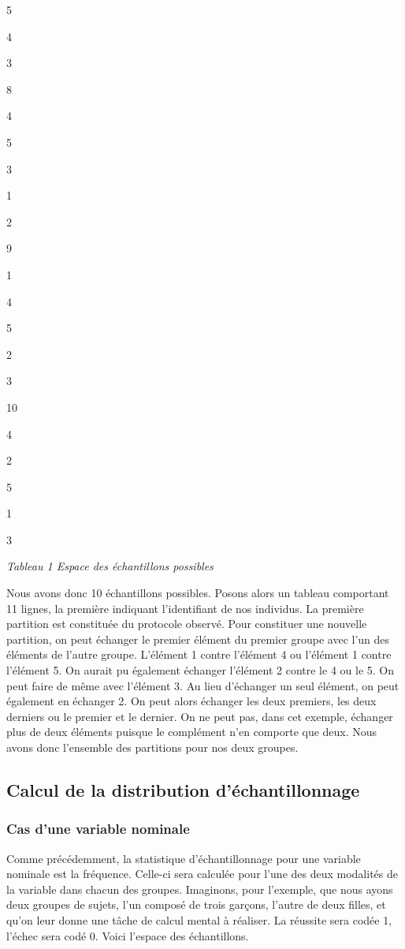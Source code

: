 \documentclass[]{book}
\theoremstyle{definition}
\theoremstyle{definition}
\theoremstyle{definition}
\theoremstyle{remark}
\begin{document}
5

4

3

8

4

5

3

1

2

9

1

4

5

2

3

10

4

2

5

1

3

\emph{Tableau 1 Espace des échantillons possibles}

Nous avons donc 10 échantillons possibles. Posons alors un tableau
comportant 11 lignes, la première indiquant l'identifiant de nos
individus. La première partition est constituée du protocole observé.
Pour constituer une nouvelle partition, on peut échanger le premier
élément du premier groupe avec l'un des éléments de l'autre groupe.
L'élément 1 contre l'élément 4 ou l'élément 1 contre l'élément 5. On
aurait pu également échanger l'élément 2 contre le 4 ou le 5. On peut
faire de même avec l'élément 3. Au lieu d'échanger un seul élément, on
peut également en échanger 2. On peut alors échanger les deux premiers,
les deux derniers ou le premier et le dernier. On ne peut pas, dans cet
exemple, échanger plus de deux éléments puisque le complément n'en
comporte que deux. Nous avons donc l'ensemble des partitions pour nos
deux groupes.

\hypertarget{calcul-de-la-distribution-dechantillonnage-2}{%
\subsection{Calcul de la distribution
d'échantillonnage}\label{calcul-de-la-distribution-dechantillonnage-2}}

\hypertarget{cas-dune-variable-nominale-1}{%
\subsubsection{Cas d'une variable
nominale}\label{cas-dune-variable-nominale-1}}

Comme précédemment, la statistique d'échantillonnage pour une variable
nominale est la fréquence. Celle-ci sera calculée pour l'une des deux
modalités de la variable dans chacun des groupes. Imaginons, pour
l'exemple, que nous ayons deux groupes de sujets, l'un composé de trois
garçons, l'autre de deux filles, et qu'on leur donne une tâche de calcul
mental à réaliser. La réussite sera codée 1, l'échec sera codé 0. Voici
l'espace des échantillons.
\end{document}
